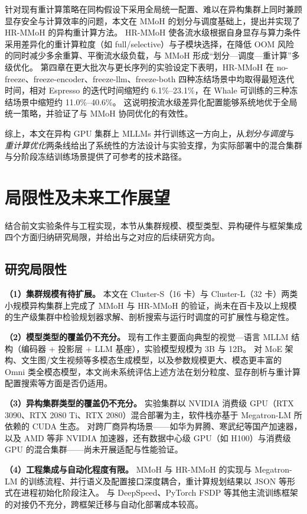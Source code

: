 针对现有重计算策略在同构假设下采用全局统一配置、难以在异构集群上同时兼顾显存安全与计算效率的问题，本文在 MMoH 的划分与调度基础上，提出并实现了 HR-MMoH 的异构重计算方法。
HR-MMoH 使各流水级根据自身显存与算力条件采用差异化的重计算粒度（如 full/selective）与子模块选择，在降低 OOM 风险的同时减少多余重算、平衡流水级负载，与 MMoH 形成“划分—调度—重计算”多级优化。
第四章在更大批次与更长序列的实验设定下表明，HR-MMoH 在 no-freeze、freeze-encoder、freeze-llm、freeze-both 四种冻结场景中均取得最短迭代时间，相对 Espresso 的迭代时间缩短约 6.1\%--23.1\%，在 Whale 可训练的三种冻结场景中缩短约 11.0\%--40.6\%。
这说明按流水级差异化配置能够系统地优于全局统一策略，并验证了与 MMoH 协同优化的有效性。

综上，本文在异构 GPU 集群上 MLLMs 并行训练这一方向上，从\emph{划分与调度}与\emph{重计算优化}两条线给出了系统性的方法设计与实验支撑，为实际部署中的混合集群与分阶段冻结训练场景提供了可参考的技术路径。

\section{局限性及未来工作展望}

结合前文实验条件与工程实现，本节从集群规模、模型类型、异构硬件与框架集成四个方面归纳研究局限，并给出与之对应的后续研究方向。

\subsection{研究局限性}

\textbf{（1）集群规模有待扩展。}
本文在 Cluster-S（16 卡）与 Cluster-L（32 卡）两类小规模异构集群上完成了 MMoH 与 HR-MMoH 的验证，尚未在百卡及以上规模的生产级集群中检验规划器求解、剖析搜索与运行时调度的可扩展性与稳定性。

\textbf{（2）模型类型的覆盖仍不充分。}
现有工作主要面向典型的视觉—语言 MLLM 结构（编码器 + 投影层 + LLM 基座），实验模型规模为 3B 与 12B。
对 MoE 架构、文生图/文生视频等多模态生成模型，以及参数规模更大、模态更丰富的 Omni 类全模态模型，本文尚未系统评估上述方法在划分粒度、显存剖析与重计算配置搜索等方面是否仍适用。

\textbf{（3）异构集群类型的覆盖仍不充分。}
实验集群以 NVIDIA 消费级 GPU（RTX 3090、RTX 2080 Ti、RTX 2080）混合部署为主，软件栈亦基于 Megatron-LM 所依赖的 CUDA 生态。
对跨厂商异构场景——如华为昇腾、寒武纪等国产加速器，以及 AMD 等非 NVIDIA 加速器，还有数据中心级 GPU（如 H100）与消费级 GPU 的混合集群——尚未开展适配与性能验证。

\textbf{（4）工程集成与自动化程度有限。}
MMoH 与 HR-MMoH 的实现与 Megatron-LM 的训练流程、并行语义及配置接口深度耦合，重计算规划结果以 JSON 等形式在进程初始化阶段注入。
与 DeepSpeed、PyTorch FSDP 等其他主流训练框架的对接仍不充分，跨框架迁移与自动化部署成本较高。

